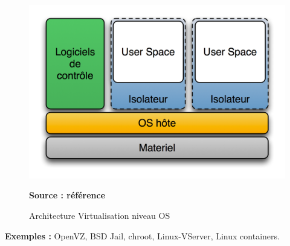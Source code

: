     \begin{figure}[H]
      \centering
      \includegraphics[scale=.8]{fig1/virtualisation_niveau_os.png}
      \caption{Architecture Virtualisation niveau OS}
      \label{fig:virtualisation_niveau_os}
      \centering \bfseries Source : référence \cite{online2}
    \end{figure}
    
\noindent \textbf{Exemples :} OpenVZ,  BSD Jail, chroot, Linux-VServer, Linux containers.
    
